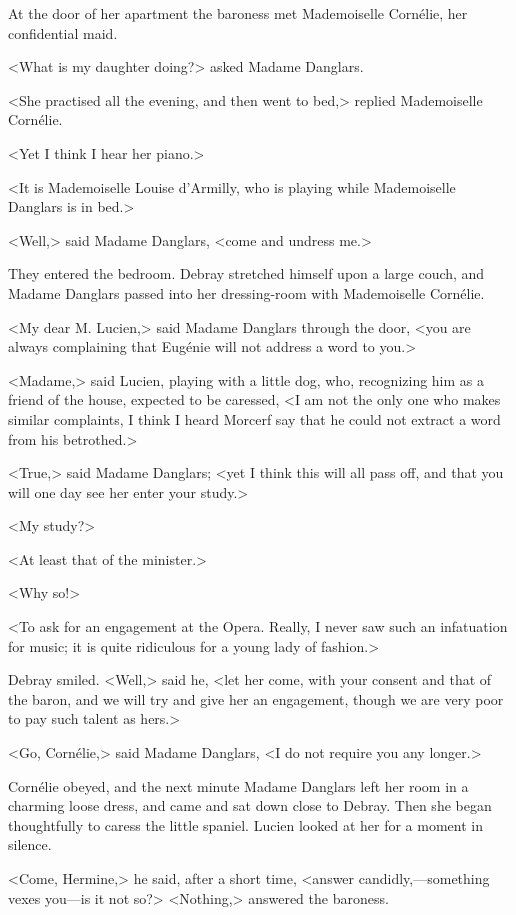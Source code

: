  At the door of her apartment the baroness met Mademoiselle Cornélie, her confidential maid. 

 <What is my daughter doing?> asked Madame Danglars. 

 <She practised all the evening, and then went to bed,> replied Mademoiselle Cornélie. 

 <Yet I think I hear her piano.> 

 <It is Mademoiselle Louise d'Armilly, who is playing while Mademoiselle Danglars is in bed.> 

 <Well,> said Madame Danglars, <come and undress me.> 

 They entered the bedroom. Debray stretched himself upon a large couch, and Madame Danglars passed into her dressing-room with Mademoiselle Cornélie. 

 <My dear M. Lucien,> said Madame Danglars through the door, <you are always complaining that Eugénie will not address a word to you.> 

 <Madame,> said Lucien, playing with a little dog, who, recognizing him as a friend of the house, expected to be caressed, <I am not the only one who makes similar complaints, I think I heard Morcerf say that he could not extract a word from his betrothed.> 

 <True,> said Madame Danglars; <yet I think this will all pass off, and that you will one day see her enter your study.> 

 <My study?> 

 <At least that of the minister.> 

 <Why so!> 

 <To ask for an engagement at the Opera. Really, I never saw such an infatuation for music; it is quite ridiculous for a young lady of fashion.> 

 Debray smiled. <Well,> said he, <let her come, with your consent and that of the baron, and we will try and give her an engagement, though we are very poor to pay such talent as hers.> 

 <Go, Cornélie,> said Madame Danglars, <I do not require you any longer.> 

 Cornélie obeyed, and the next minute Madame Danglars left her room in a charming loose dress, and came and sat down close to Debray. Then she began thoughtfully to caress the little spaniel. Lucien looked at her for a moment in silence. 

 <Come, Hermine,> he said, after a short time, <answer candidly,—something vexes you—is it not so?>  <Nothing,> answered the baroness. 

